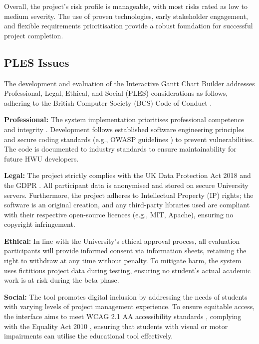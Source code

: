 \documentclass[12pt,nonacm,acmlarge,titlepage,screen]{acmart}
\begin{document}
Overall, the project's risk profile is manageable, with most risks rated as low to medium severity. The use of proven technologies, early stakeholder engagement, and flexible requirements prioritisation provide a robust foundation for successful project completion.

\subsection{PLES Issues}

The development and evaluation of the Interactive Gantt Chart Builder addresses Professional, Legal, Ethical, and Social (PLES) considerations as follows, adhering to the British Computer Society (BCS) Code of Conduct \cite{BCS_Code_of_Conduct}.

\textbf{Professional:} The system implementation prioritises professional competence and integrity \cite{BCS_Code_of_Conduct}. Development follows established software engineering principles and secure coding standards (e.g., OWASP guidelines \cite{OWASP_2021}) to prevent vulnerabilities. The code is documented to industry standards to ensure maintainability for future HWU developers.

\textbf{Legal:} The project strictly complies with the UK Data Protection Act 2018 \cite{Data_Protection_Act_2018} and the GDPR \cite{EU_GDPR_2016}. All participant data is anonymised and stored on secure University servers. Furthermore, the project adheres to Intellectual Property (IP) rights; the software is an original creation, and any third-party libraries used are compliant with their respective open-source licences (e.g., MIT, Apache), ensuring no copyright infringement.

\textbf{Ethical:} In line with the University's ethical approval process, all evaluation participants will provide informed consent via information sheets, retaining the right to withdraw at any time without penalty. To mitigate harm, the system uses fictitious project data during testing, ensuring no student's actual academic work is at risk during the beta phase.

\textbf{Social:} The tool promotes digital inclusion by addressing the needs of students with varying levels of project management experience. To ensure equitable access, the interface aims to meet WCAG 2.1 AA accessibility standards \cite{W3C_WCAG_21}, complying with the Equality Act 2010 \cite{Equality_Act_2010}, ensuring that students with visual or motor impairments can utilise the educational tool effectively.
\end{document}
